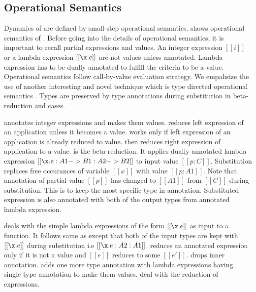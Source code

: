 \subsection{Operational Semantics}
\label{sec:union:os}
Dynamics of \cal are defined by small-step operational semantics. 
 shows
operational semantics of \cal. Before going into the details of operational semantics, it is important
to recall partial expressions and values. An integer expression $[[i]]$ or a lambda expression $[[\x.e]]$
are not values unless annotated. Lambda expression has to be dually annotated to fulfill the criteria to
be a value. Operational semantics follow call-by-value evaluation strategy.
We empahsize the use of another interesting and novel technique which is type directed operational
semantics . Types are preserved by type annotations during substitution
in beta-reduction and \typeof cases.

 annotates integer expressions and makes them values.  reduces left expression
of an application unless it becomes a value.  works only if left expression of an
application is already reduced to value.  then reduces right expression of
application to a value.
 is the beta-reduction. It applies dually annotated lambda expression 
$[[\x.e : A1 -> B1 : A2 -> B2]]$ to input value $[[p:C]]$. Substitution replaces free occurances of variable
$[[x]]$ with value $[[p:A1]]$. Note that annotation of partial value $[[p]]$ has changed to $[[A1]]$ from 
$[[C]]$ during substitution.
This is to keep the most specific type in annotation. Substituted expression is also
annotated with both of the output types from annotated lambda expression. 

 deals with the simple lambda expressions of the form $[[\x.e]]$ as input to a function.
It follows same as  except that both of the input types are kept with $[[\x.e]]$ during
substitution i.e $[[\x.e:A2:A1]]$.  reduces an annotated expression only if it is not a value
and $[[e]]$ reduces to some $[[e']]$.  drops inner annotation.  adds one
more type annotation with lambda expressions having single type annotation to make them values.
 deal with the reduction of \typeof expressions.

